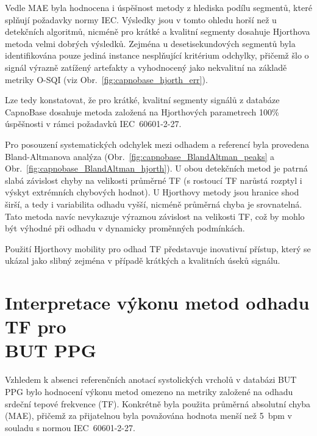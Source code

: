 Vedle \acs{MAE} byla hodnocena i úspěšnost metody z hlediska podílu segmentů, které splňují požadavky normy IEC.
Výsledky jsou v tomto ohledu horší než u detekčních algoritmů, nicméně pro krátké a kvalitní segmenty dosahuje Hjorthova metoda velmi dobrých výsledků.
Zejména u desetisekundových segmentů byla identifikována pouze jediná instance nesplňující kritérium odchylky, přičemž šlo o signál výrazně zatížený artefakty a vyhodnocený jako nekvalitní na základě metriky O-SQI (viz Obr.~\ref{fig:capnobase_hjorth_err}).

Lze tedy konstatovat, že pro krátké, kvalitní segmenty signálů z databáze CapnoBase dosahuje metoda založená na Hjorthových parametrech 100\% úspěšnosti v rámci požadavků IEC~60601-2-27.

Pro posouzení systematických odchylek mezi odhadem a referencí byla provedena Bland-Altmanova analýza (Obr.~\ref{fig:capnobase_BlandAltman_peaks} a Obr.~\ref{fig:capnobase_BlandAltman_hjorth}).
U obou detekčních metod je patrná slabá závislost chyby na velikosti průměrné \acs{TF} (s rostoucí \acs{TF} narůstá rozptyl i výskyt extrémních chybových hodnot).
U Hjorthovy metody jsou hranice shod širší, a tedy i variabilita odhadu vyšší, nicméně průměrná chyba je srovnatelná.
Tato metoda navíc nevykazuje výraznou závislost na velikosti \acs{TF}, což by mohlo být výhodné při odhadu v dynamicky proměnných podmínkách.

Použití Hjorthovy mobility pro odhad \acs{TF} představuje inovativní přístup, který se ukázal jako slibný zejména v případě krátkých a kvalitních úseků signálu.

\section[Interpretace výkonu metod odhadu TF pro BUT PPG]{Interpretace výkonu metod odhadu TF pro\\BUT PPG}
Vzhledem k absenci referenčních anotací systolických vrcholů v databázi BUT PPG bylo hodnocení výkonu metod omezeno na metriky založené na odhadu srdeční tepové frekvence (\acs{TF}).
Konkrétně byla použita průměrná absolutní chyba (\acs{MAE}), přičemž za přijatelnou byla považována hodnota menší než 5~\acs{bpm} v souladu s normou IEC~60601-2-27.

